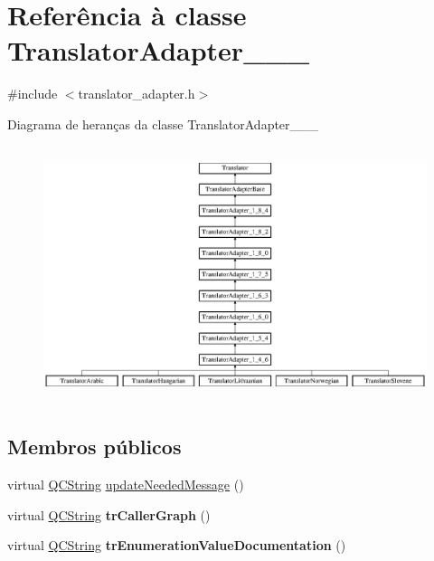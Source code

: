 \hypertarget{class_translator_adapter__1__4__6}{\section{Referência à classe Translator\-Adapter\-\_\-\_\-\_}
\label{class_translator_adapter__1__4__6}
}


{\ttfamily \#include $<$translator\-\_\-adapter.\-h$>$}

Diagrama de heranças da classe Translator\-Adapter\-\_\-\_\-\_\begin{figure}[H]
\begin{center}
\leavevmode
\includegraphics[height=7.512195cm]{class_translator_adapter__1__4__6}
\end{center}
\end{figure}
\subsection*{Membros públicos}
\begin{DoxyCompactItemize}
\item 
virtual \hyperlink{class_q_c_string}{Q\-C\-String} \hyperlink{class_translator_adapter__1__4__6_aa2c053398a494e36caf5152d9a4fc6cf}{update\-Needed\-Message} ()
\item 
\hypertarget{class_translator_adapter__1__4__6_ae1d7d38cc426cd25124b1658b1125841}{virtual \hyperlink{class_q_c_string}{Q\-C\-String} {\bfseries tr\-Caller\-Graph} ()}\label{class_translator_adapter__1__4__6_ae1d7d38cc426cd25124b1658b1125841}

\item 
\hypertarget{class_translator_adapter__1__4__6_a4039294191fddf0e9530b920719998fd}{virtual \hyperlink{class_q_c_string}{Q\-C\-String} {\bfseries tr\-Enumeration\-Value\-Documentation} ()}\label{class_translator_adapter__1__4__6_a4039294191fddf0e9530b920719998fd}

\end{DoxyCompactItemize}
